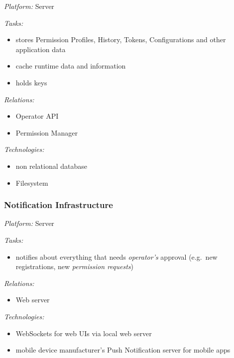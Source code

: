 \documentclass[12pt,english,a4paper,titlepage,cleardoublepage=empty,dottedtoc]{report}
\providecommand{\tightlist}{%
  \setlength{\itemsep}{0pt}\setlength{\parskip}{0pt}}
\begin{document}
\emph{Platform:} Server

\emph{Tasks:}

\begin{itemize}
\tightlist
\item
  stores Permission Profiles, History, Tokens, Configurations and other
  application data
\item
  cache runtime data and information
\item
  holds keys
\end{itemize}

\emph{Relations:}

\begin{itemize}
\tightlist
\item
  Operator API
\item
  Permission Manager
\end{itemize}

\emph{Technologies:}

\begin{itemize}
\tightlist
\item
  non relational database
\item
  Filesystem
\end{itemize}

\subsubsection*{Notification
Infrastructure}\label{notification-infrastructure}

\emph{Platform:} Server

\emph{Tasks:}

\begin{itemize}
\tightlist
\item
  notifies about everything that needs \emph{operator's} approval
  (e.g.~new registrations, new \emph{permission requests})
\end{itemize}

\emph{Relations:}

\begin{itemize}
\tightlist
\item
  Web server
\end{itemize}

\emph{Technologies:}

\begin{itemize}
\tightlist
\item
  WebSockets for web UIs via local web server
\item
  mobile device manufacturer's Push Notification server for mobile apps
\end{itemize}
\end{document}
